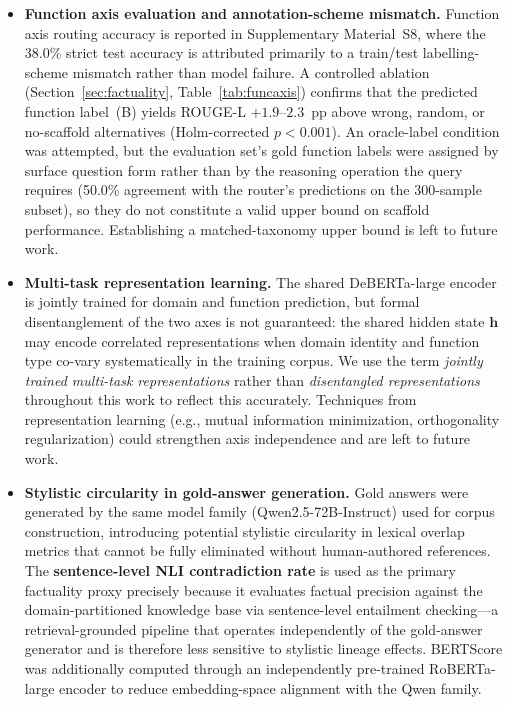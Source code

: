 \documentclass[a4paper,fleql,doubleblind]{cas-sc}
\begin{document}
\begin{itemize}
\item \textbf{Function axis evaluation and annotation-scheme mismatch.}
    Function axis routing accuracy is reported in Supplementary Material~S8,
    where the 38.0\% strict test accuracy is attributed primarily to a
    train/test labelling-scheme mismatch rather than model failure.
    A controlled ablation (Section~\ref{sec:factuality},
    Table~\ref{tab:funcaxis}) confirms that the predicted function label~(B)
    yields ROUGE-L $+1.9$--$2.3$~pp above wrong, random, or no-scaffold
    alternatives (Holm-corrected $p{<}0.001$).
    An oracle-label condition was attempted, but the evaluation set's gold
    function labels were assigned by surface question form rather than by the
    reasoning operation the query requires (50.0\% agreement with the router's
    predictions on the 300-sample subset), so they do not constitute a valid
    upper bound on scaffold performance. Establishing a matched-taxonomy upper
    bound is left to future work.
\item \textbf{Multi-task representation learning.}
The shared DeBERTa-large encoder is jointly trained for domain and function prediction,
but formal disentanglement of the two axes is not guaranteed: the shared hidden state
$\mathbf{h}$ may encode correlated representations when domain identity and function type
co-vary systematically in the training corpus. We use the term \emph{jointly trained multi-task
representations} rather than \emph{disentangled representations} throughout this work
to reflect this accurately. Techniques from representation learning (e.g., mutual information
minimization, orthogonality regularization) could strengthen axis independence and are
left to future work.
\item \textbf{Stylistic circularity in gold-answer generation.} Gold answers were generated by the same model family (Qwen2.5-72B-Instruct)
used for corpus construction, introducing potential stylistic circularity in
lexical overlap metrics that cannot be fully eliminated without human-authored
references.
The \textbf{sentence-level NLI contradiction rate} is used as the primary factuality proxy precisely because
it evaluates factual precision against the domain-partitioned knowledge base
via sentence-level entailment checking---a retrieval-grounded pipeline that operates
independently of the gold-answer generator and is therefore less sensitive to
stylistic lineage effects.
BERTScore was additionally computed through an independently pre-trained
RoBERTa-large encoder to reduce embedding-space alignment with the Qwen family.

\end{itemize}
\end{document}

